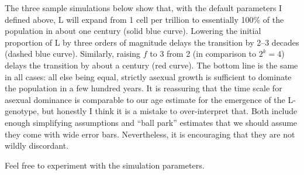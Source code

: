 \documentclass{article}\usepackage[]{graphicx}\usepackage[]{color}
\begin{document}
The three sample simulations below show that, with the default parameters I defined above, L will
expand from 1 cell per trillion to essentially 100\% of the population in about one century (solid
blue curve).  Lowering the initial proportion of L by three orders of magnitude delays the
transition by 2--3 decades (dashed blue curve).  Similarly, raising $f$ to 3 from 2 (in comparison
to $2^k=4$) delays the transition by about a century (red curve).  The bottom line is the same in
all cases: all else being equal, strictly asexual growth is sufficient to dominate the population in
a few hundred years.  It is reassuring that the time scale for asexual dominance is comparable to
our age estimate for the emergence of the L-genotype, but honestly I think it is a mistake to
over-interpret that.  Both include enough simplifying assumptions and ``ball park'' estimates that
we should assume they come with wide error bars.  Nevertheless, it is encouraging that they are not
wildly discordant.

Feel free to experiment with the simulation parameters.  
\end{document}
